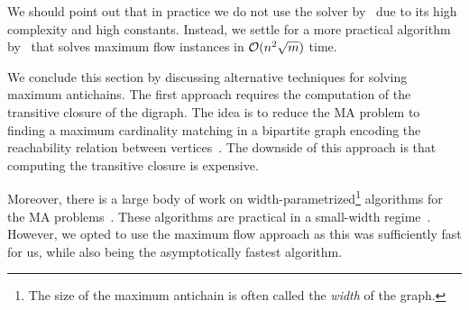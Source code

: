 We should point out that in practice we do not use the solver by~\citet{chen2022maximum} due to its high complexity and high constants.
Instead, we settle for a more practical algorithm by~\citet{goldberg2008partial} that solves maximum flow instances in $\mathcal{O}(n^2\sqrt{m})$ time. 

We conclude this section by discussing alternative techniques for solving maximum antichains.
The first approach
requires the computation of the transitive closure of the digraph. The idea is to reduce the MA problem to finding a maximum cardinality matching in a bipartite graph encoding the reachability relation between vertices~\cite{felsner2003recognition, dilworth1987decomposition, fulkerson1956note}.
The downside of this approach is that computing the transitive closure is expensive.

Moreover, there is a large body of work on width-parametrized\footnote{The size of the maximum antichain is often called the \emph{width} of the graph.} algorithms for the MA problems~\cite{caceres2023minimum,caceres2022minimum,caceressoda,kowaluk2008path,makinen2019sparse,felsner2003recognition}. These algorithms are practical in a small-width regime~\cite{caceres2023minimum}.
However, we opted to use the maximum flow approach as this was sufficiently fast for us, while also being the asymptotically fastest algorithm.